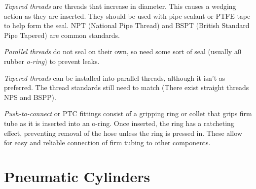 \begin{asparaenum}[a)]
	\item  \textit{Tapered threads} are threads that increase in diameter. This causes a wedging action as they are inserted. They should be used with pipe sealant or PTFE tape to help form the seal. NPT (National Pipe Thread) and BSPT (British Standard Pipe Tapered) are common standards.
	\item \textit{Parallel threads} do not seal on their own, so need some sort of seal (usually a0 rubber \textit{o-ring}) to prevent leaks.
	\item \textit{Tapered threads} can be installed into parallel threads, although it isn't as preferred. The thread standards still need to match (There exist straight threads NPS and BSPP).
	\item \textit{Push-to-connect} or PTC fittings consist of a gripping ring or collet that grips firm tube as it is inserted into an o-ring. Once inserted, the ring has a ratcheting effect, preventing removal of the hose unless the ring is pressed in. These allow for easy and reliable connection of firm tubing to other components.	
\end{asparaenum}


\section{Pneumatic Cylinders}

